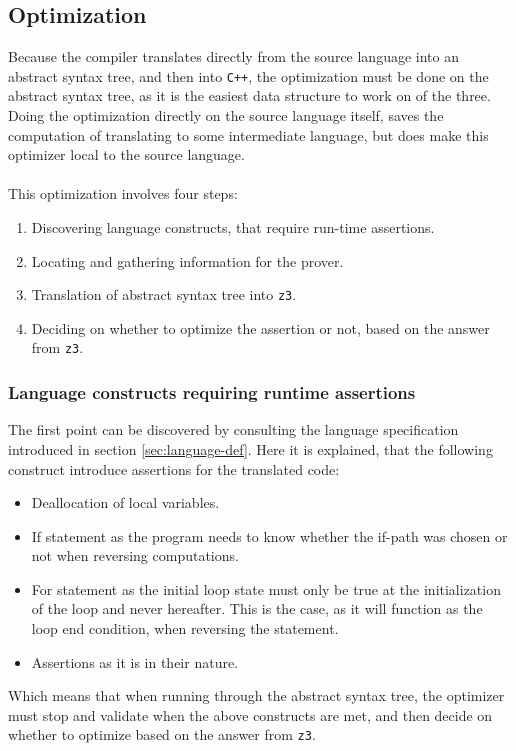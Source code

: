 \subsection{Optimization }
Because the compiler translates directly from the source language into an abstract syntax tree,
and then into \texttt{C++}, the optimization must be done on the abstract syntax tree, as it is
the easiest data structure to work on of the three. Doing the optimization directly on the source
language itself, saves the computation of translating to some intermediate language, but does
make this optimizer local to the source language.
\\
\\
This optimization involves four steps:
\begin{enumerate}
    \item Discovering language constructs, that require run-time assertions.
    \item Locating and gathering information for the prover.
    \item Translation of abstract syntax tree into \texttt{z3}.
    \item Deciding on whether to optimize the assertion or not, based on the answer
          from \texttt{z3}.
\end{enumerate}

\subsubsection{Language constructs requiring runtime assertions }
The first point can be discovered by consulting the language specification introduced
in section \ref{sec:language-def}. Here it is explained, that the following construct introduce
assertions for the translated code:
\begin{itemize} %
    \item Deallocation of local variables.
    \item If statement as the program needs to know whether the if-path was chosen or not when
          reversing computations.

    \item For statement as the initial loop state must only be true at the initialization of the
          loop and never hereafter. This is the case, as it will function as the loop end
          condition, when reversing the statement.

    \item Assertions as it is in their nature.
\end{itemize}
\noindent
Which means that when running through the abstract syntax tree, the optimizer must stop and validate
when the above constructs are met, and then decide on whether to optimize based on the answer from
\texttt{z3}.

